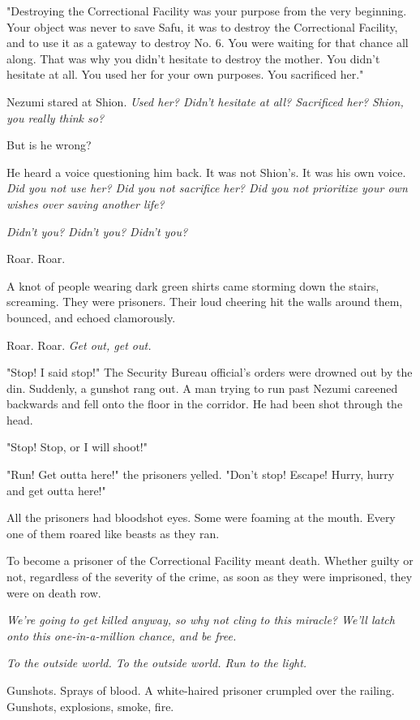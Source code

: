 "Destroying the Correctional Facility was your purpose from the very
beginning. Your object was never to save Safu, it was to destroy the
Correctional Facility, and to use it as a gateway to destroy No. 6. You
were waiting for that chance all along. That was why you didn't hesitate
to destroy the mother. You didn't hesitate at all. You used her for your
own purposes. You sacrificed her."

Nezumi stared at Shion. \emph{Used her? Didn't hesitate at all? Sacrificed
her? Shion, you really think so?}

But is he wrong?

He heard a voice questioning him back. It was not Shion's. It was his
own voice. \emph{Did you not use her? Did you not sacrifice her? Did you not
prioritize your own wishes over saving another life?}

\emph{Didn't you? Didn't you? Didn't you?}

Roar. Roar.

A knot of people wearing dark green shirts came storming down the
stairs, screaming. They were prisoners. Their loud cheering hit the
walls around them, bounced, and echoed clamorously.

Roar. Roar. \emph{Get out, get out.}

"Stop! I said stop!" The Security Bureau official's orders were drowned
out by the din. Suddenly, a gunshot rang out. A man trying to run past
Nezumi careened backwards and fell onto the floor in the corridor. He
had been shot through the head.

"Stop! Stop, or I will shoot!"

"Run! Get outta here!" the prisoners yelled. "Don't stop! Escape! Hurry,
hurry and get outta here!"

All the prisoners had bloodshot eyes. Some were foaming at the mouth.
Every one of them roared like beasts as they ran.

To become a prisoner of the Correctional Facility meant death. Whether
guilty or not, regardless of the severity of the crime, as soon as they
were imprisoned, they were on death row.

\emph{We're going to get killed anyway, so why not cling to this miracle?
We'll latch onto this one-in-a-million chance, and be free.}

\emph{To the outside world. To the outside world. Run to the light.}

Gunshots. Sprays of blood. A white-haired prisoner crumpled over the
railing. Gunshots, explosions, smoke, fire.

